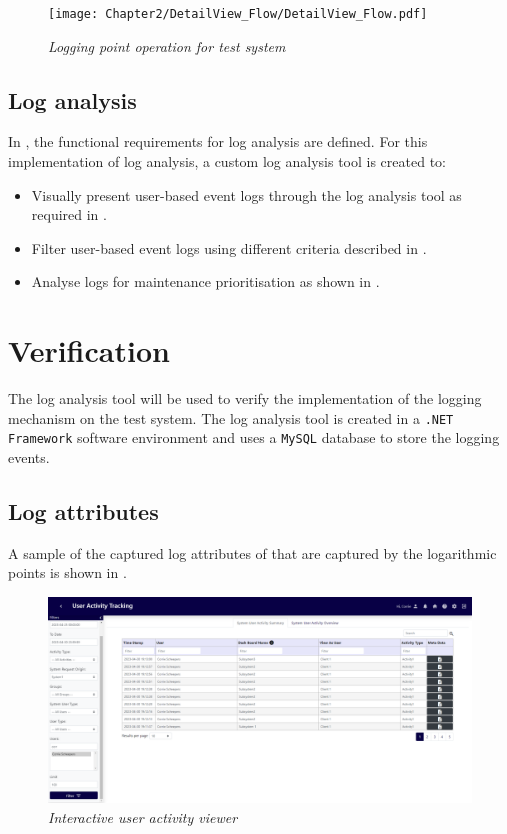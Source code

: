 \begin{figure}[!htb]
	\centering %
	\texttt{[image: Chapter2/DetailView\_Flow/DetailView\_Flow.pdf]}
	\caption[Logging point operation for test system]
	{\textit{Logging point operation for test system}}\label{fig:ch3_loggingProcess}
\end{figure}

\clearpage

\subsection{Log analysis}\label{sec:ch3_implementationLogAnalysis}
In , the functional requirements for log analysis are defined. For this implementation of log analysis, a custom log analysis tool is created to:

\begin{itemize}
\item Visually present user-based event logs through the log analysis tool as required in .
\item Filter user-based event logs using different criteria described in .
\item Analyse logs for maintenance prioritisation as shown in .
\end{itemize}

\section{Verification}\label{sec:ch3_Verification}
The log analysis tool will be used to verify the implementation of the logging mechanism on the test system. The log analysis tool is created in a \texttt{.NET Framework} software environment and uses a \texttt{MySQL} database to store the logging events.

\subsection{Log attributes}
A sample of the captured log attributes of  that are captured by the logarithmic points is shown in .

\begin{figure}[!htb]
	\centering %
	\includegraphics[width=0.99\linewidth]{img/ch3/analysis/UAT_menu.png}
	\caption[Interactive user activity viewer]
	{\textit{Interactive user activity viewer}}\label{fig:ch3_UAT_menu}
\end{figure}

